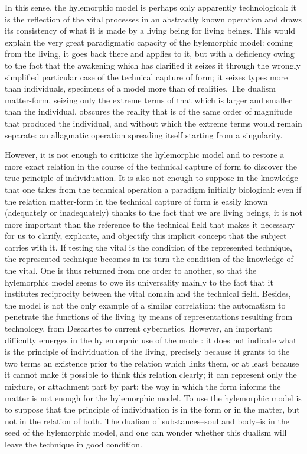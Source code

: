 \documentclass[a4paper]{article}
\begin{document}
In this sense, the hylemorphic model is perhaps only apparently technological: it is the reflection of the vital processes in an abstractly known operation and draws its consistency of what it is made by a living being for living beings. This would explain the very great paradigmatic capacity of the hylemorphic model: coming from the living, it goes back there and applies to it, but with a deficiency owing to the fact that the awakening which has clarified it seizes it through the wrongly simplified particular case of the technical capture of form; it seizes types more than individuals, specimens of a model more than of realities. The dualism matter-form, seizing only the extreme terms of that which is larger and smaller than the individual, obscures the reality that is of the same order of magnitude that produced the individual, and without which the extreme terms would remain separate: an allagmatic operation spreading itself starting from a singularity.

However, it is not enough to criticize the hylemorphic model and to restore a more exact relation in the course of the technical capture of form to discover the true principle of individuation. It is also not enough to suppose in the knowledge that one takes from the technical operation a paradigm initially biological: even if the relation matter-form in the technical capture of form is easily known (adequately or inadequately) thanks to the fact that we are living beings, it is not more important than the reference to the technical field that makes it necessary for us to clarify, explicate, and objectify this implicit concept that the subject carries with it. If testing the vital is the condition of the represented technique, the represented technique becomes in its turn the condition of the knowledge of the vital. One is thus returned from one order to another, so that the hylemorphic model seems to owe its universality mainly to the fact that it institutes reciprocity between the vital domain and the technical field. Besides, the model is not the only example of a similar correlation: the automatism to penetrate the functions of the living by means of representations resulting from technology, from Descartes to current cybernetics. However, an important difficulty emerges in the hylemorphic use of the model: it does not indicate what is the principle of individuation of the living, precisely because it grants to the two terms an existence prior to the relation which links them, or at least because it cannot make it possible to think this relation clearly; it can represent only the mixture, or attachment part by part; the way in which the form informs the matter is not enough for the hylemorphic model. To use the hylemorphic model is to suppose that the principle of individuation is in the form or in the matter, but not in the relation of both. The dualism of substances–soul and body–is in the seed of the hylemorphic model, and one can wonder whether this dualism will leave the technique in good condition.
\end{document}
